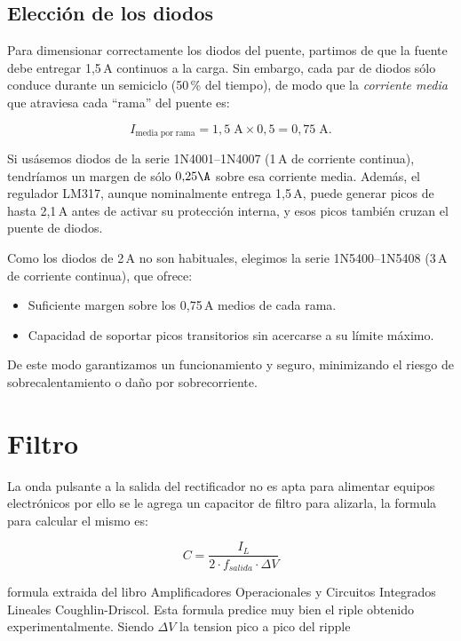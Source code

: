 \subsection{Elección de los diodos}

Para dimensionar correctamente los diodos del puente, partimos de que la fuente debe entregar 1,5\,A continuos a la carga. Sin embargo, cada
par de diodos sólo conduce durante un semiciclo (50\,\% del tiempo), de modo que la \emph{corriente media} que atraviesa cada “rama” del
puente es:


\begin{equation}
I_{\mathrm{media\;por\;rama}} = 1{,}5\;\mathrm{A} \times 0{,}5 = 0{,}75\;\mathrm{A}.
\end{equation}

Si usásemos diodos de la serie 1N4001–1N4007 (1\,A de corriente continua), tendríamos un margen de sólo $0{,}25\A$ sobre esa
corriente media. Además, el regulador LM317, aunque nominalmente entrega 1,5\,A, puede generar picos de hasta 2,1\,A antes
de activar su protección interna, y esos picos también cruzan el puente de diodos.

Como los diodos de 2\,A no son habituales, elegimos la serie 1N5400–1N5408 (3\,A de corriente continua), que ofrece:

\begin{itemize}
    \item Suficiente margen sobre los 0,75\,A medios de cada rama.
    \item Capacidad de soportar picos transitorios sin acercarse a su límite máximo.
\end{itemize}

De este modo garantizamos un funcionamiento y seguro, minimizando el riesgo de sobrecalentamiento o daño por sobrecorriente.

\section{Filtro}
\label{sec:filtro}
La onda pulsante a la salida del rectificador no es apta para alimentar
equipos electrónicos por ello se le agrega un capacitor de filtro para
alizarla, la formula para calcular el mismo es:

\begin{equation}
  C=\frac{I_L}{2 \cdot f_{salida} \cdot \Delta V}
  \label{eq:filtro}
\end{equation}

formula extraida del libro Amplificadores Operacionales y Circuitos Integrados Lineales Coughlin-Driscol. Esta formula predice
muy bien el riple obtenido experimentalmente.
Siendo $\Delta V$ la tension pico a pico del ripple

